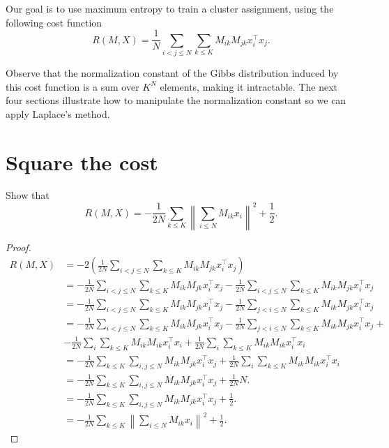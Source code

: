Our goal is to use maximum entropy to train a cluster assignment, using the following cost function
%
\begin{equation}
R(M, X) = \frac{1}{N}\sum_{i < j \leq N} \sum_{k \leq K} M_{ik}M_{jk}x_i^\top x_j.
\end{equation}
%

Observe that the normalization constant of the Gibbs distribution induced by this cost function is a sum over $K^N$ elements, making it intractable. The next four sections illustrate how to manipulate the normalization constant so we can apply Laplace's method.

%

\section{Square the cost}
\label{sec:cost_function_la}

\begin{exercise}
Show that
%
\begin{equation}
R(M, X) = -\frac{1}{2N}\sum_{k \leq K}\left\|\sum_{i \leq N} M_{ik}x_i\right\|^2 + \frac{1}{2}.
\end{equation}
\label{ex:cost_fun_quad}
\end{exercise}

\begin{proof}
%
\begin{align}
R(M, X) &= -2\left(\frac{1}{2N}\sum_{i < j \leq N} \sum_{k \leq K} M_{ik}M_{jk}x_i^\top x_j\right)\\
&= -\frac{1}{2N}\sum_{i < j \leq N} \sum_{k \leq K} M_{ik}M_{jk}x_i^\top x_j -\frac{1}{2N}\sum_{i < j \leq N} \sum_{k \leq K} M_{ik}M_{jk}x_i^\top x_j\\
&= -\frac{1}{2N}\sum_{i < j \leq N} \sum_{k \leq K} M_{ik}M_{jk}x_i^\top x_j -\frac{1}{2N}\sum_{j < i \leq N} \sum_{k \leq K} M_{ik}M_{jk}x_i^\top x_j\\
&= -\frac{1}{2N}\sum_{i < j \leq N} \sum_{k \leq K} M_{ik}M_{jk}x_i^\top x_j-\frac{1}{2N}\sum_{j < i \leq N} \sum_{k \leq K} M_{ik}M_{jk}x_i^\top x_j+\\
& -\frac{1}{2N}\sum_{i} \sum_{k \leq K} M_{ik}M_{ik}x_i^\top x_i+\frac{1}{2N}\sum_{i} \sum_{k \leq K} M_{ik}M_{ik}x_i^\top x_i\\
&= -\frac{1}{2N}\sum_{k \leq K}\sum_{i, j \leq N}  M_{ik}M_{jk}x_i^\top x_j + \frac{1}{2N}\sum_{i} \sum_{k \leq K} M_{ik}M_{ik}x_i^\top x_i\\
&= - \frac{1}{2N}\sum_{k \leq K}\sum_{i, j \leq N} M_{ik}M_{jk} x_i^\top x_j + \frac{1}{2N}N.\\
&= - \frac{1}{2N}\sum_{k \leq K}\sum_{i, j \leq N} M_{ik}M_{jk} x_i^\top x_j + \frac{1}{2}.\\
&= - \frac{1}{2N}\sum_{k \leq K}\left\|\sum_{i \leq N} M_{ik}x_i\right\|^2 + \frac{1}{2}.
\end{align}
%
\end{proof}

